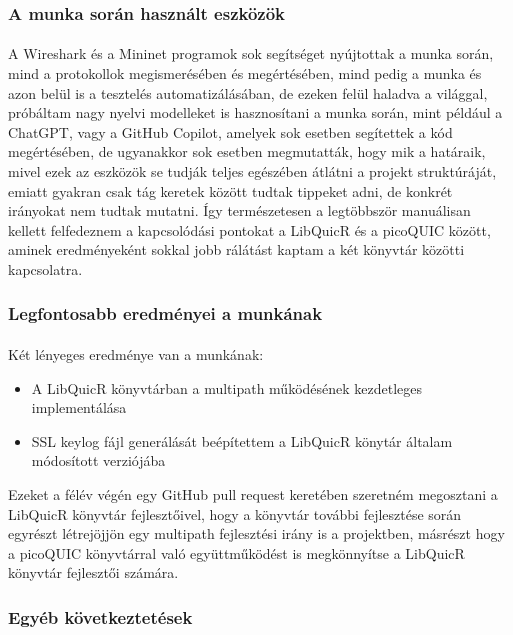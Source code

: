 \documentclass[a4paper,oneside]{article}
\begin{document}
\subsubsection{A munka során használt eszközök}
\paragraph{}
A Wireshark és a Mininet programok sok segítséget nyújtottak a munka során, mind a protokollok 
megismerésében és megértésében, mind pedig a munka és azon belül is a tesztelés automatizálásában, de ezeken 
felül haladva a világgal, próbáltam nagy nyelvi modelleket is hasznosítani a munka során, mint például a ChatGPT, vagy a GitHub Copilot,
amelyek sok esetben segítettek a kód megértésében, de ugyanakkor sok esetben megmutatták, hogy mik a határaik, mivel 
ezek az eszközök se tudják teljes egészében átlátni a projekt struktúráját, emiatt gyakran csak tág keretek között tudtak tippeket adni, de konkrét
irányokat nem tudtak mutatni. Így természetesen a legtöbbször manuálisan kellett felfedeznem a kapcsolódási pontokat a LibQuicR és a picoQUIC között,
aminek eredményeként sokkal jobb rálátást kaptam a két könyvtár közötti kapcsolatra.

\subsubsection{Legfontosabb eredményei a munkának}
\paragraph{}

Két lényeges eredménye van a munkának:
\begin{itemize}
  \item A LibQuicR könyvtárban a multipath működésének kezdetleges implementálása
  \item SSL keylog fájl generálását beépítettem a LibQuicR könytár általam módosított verziójába
\end{itemize}
Ezeket a félév végén egy GitHub pull request keretében szeretném megosztani a LibQuicR könyvtár fejlesztőivel,
hogy a könyvtár további fejlesztése során egyrészt létrejöjjön egy multipath fejlesztési irány is a projektben, másrészt hogy
a picoQUIC könyvtárral való együttműködést is megkönnyítse a LibQuicR könyvtár fejlesztői számára.

\subsubsection{Egyéb következtetések}
\end{document}
